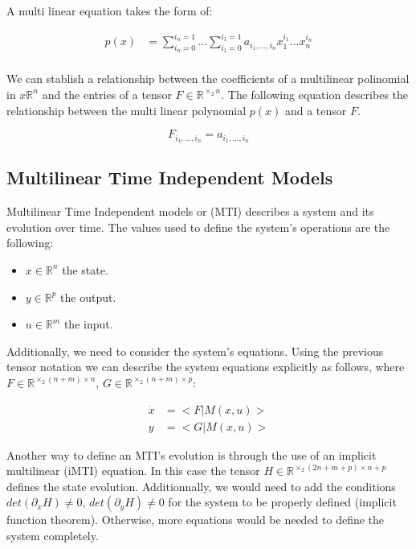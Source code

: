 \documentclass{article}
\begin{document}
A multi linear equation takes the form of:

\begin{align}
    p(x) &= \sum_{i_n = 0}^{i_n = 1}...\sum_{i_1 = 0}^{i_1 = 1} a_{i_1, ..., i_n} x_1^{i_1}...x_n^{i_n} \\ 
\end{align}

We can stablish a relationship between the coefficients of a multilinear polinomial in $x\mathbb{R}^{n}$ 
and the entries of a tensor $F \in \mathbb{R}^{\times_2 n}$. The following equation describes the relationship between
the multi linear polynomial $p(x)$ and a tensor $F$.

\begin{equation}
    F_{i_1,...,i_n} = a_{i_1, ..., i_n}
\end{equation}

\subsection{Multilinear Time Independent Models}

Multilinear Time Independent models or (MTI) describes a system and its evolution over time. 
The values used to define the system's operations are the following:

\begin{itemize}
    \item $x \in\mathbb{R}^n$ the state.   
    \item $y \in\mathbb{R}^p$ the output.   
    \item $u \in\mathbb{R}^m$ the input.   
\end{itemize}

Additionally, we need to consider the system's equations. 
Using the previous tensor notation we can describe the system equations explicitly as follows,
where $F \in \mathbb{R}^{\times_2 (n+m) \times n}$, $G \in \mathbb{R}^{\times_2 (n+m) \times p}$:

\begin{align}
    \dot{x} &= <F|M(x,u)>\\
    y &= <G|M(x,u)>
\end{align}

Another way to define an MTI's evolution is through the use of an implicit multilinear (iMTI) equation.
In this case the tensor $H \in \mathbb{R}^{\times_2 (2n+m+p) \times n+p}$ defines the state evolution. 
Additionnally, we would need to add the conditions $det(\partial_{\dot{x}} H) \neq 0$, $det(\partial_y H) \neq 0$ 
for the system to be properly defined (implicit function theorem). Otherwise, more equations would be needed to 
define the system completely.
\end{document}

